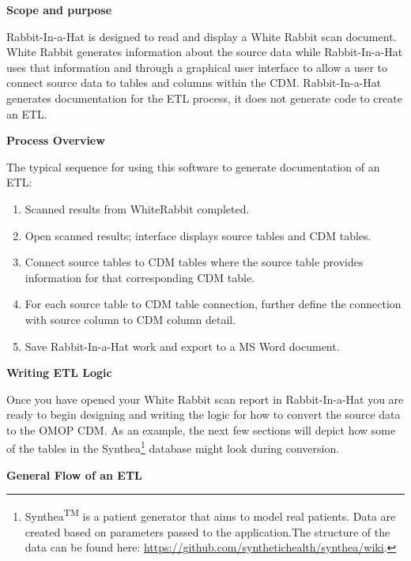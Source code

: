 \documentclass[11pt]{book}
\providecommand{\tightlist}{%
  \setlength{\itemsep}{0pt}\setlength{\parskip}{0pt}}
\let\rmarkdownfootnote\footnote%
\def\footnote{\protect\rmarkdownfootnote}
\theoremstyle{definition}
\theoremstyle{definition}
\theoremstyle{definition}
\theoremstyle{remark}
\begin{document}
\textbf{Scope and purpose}

Rabbit-In-a-Hat is designed to read and display a White Rabbit scan document. White Rabbit generates information about the source data while Rabbit-In-a-Hat uses that information and through a graphical user interface to allow a user to connect source data to tables and columns within the CDM. Rabbit-In-a-Hat generates documentation for the ETL process, it does not generate code to create an ETL.

\textbf{Process Overview}

The typical sequence for using this software to generate documentation of an ETL:

\begin{enumerate}
\def\labelenumi{\arabic{enumi}.}
\tightlist
\item
  Scanned results from WhiteRabbit completed.
\item
  Open scanned results; interface displays source tables and CDM tables.
\item
  Connect source tables to CDM tables where the source table provides information for that corresponding CDM table.
\item
  For each source table to CDM table connection, further define the connection with source column to CDM column detail.
\item
  Save Rabbit-In-a-Hat work and export to a MS Word document.
\end{enumerate}

\textbf{Writing ETL Logic}

Once you have opened your White Rabbit scan report in Rabbit-In-a-Hat you are ready to begin designing and writing the logic for how to convert the source data to the OMOP CDM. As an example, the next few sections will depict how some of the tables in the Synthea\footnote{Synthea\textsuperscript{TM} is a patient generator that aims to model real patients. Data are created based on parameters passed to the application.The structure of the data can be found here: \url{https://github.com/synthetichealth/synthea/wiki}.} database might look during conversion.

\textbf{General Flow of an ETL}
\end{document}
